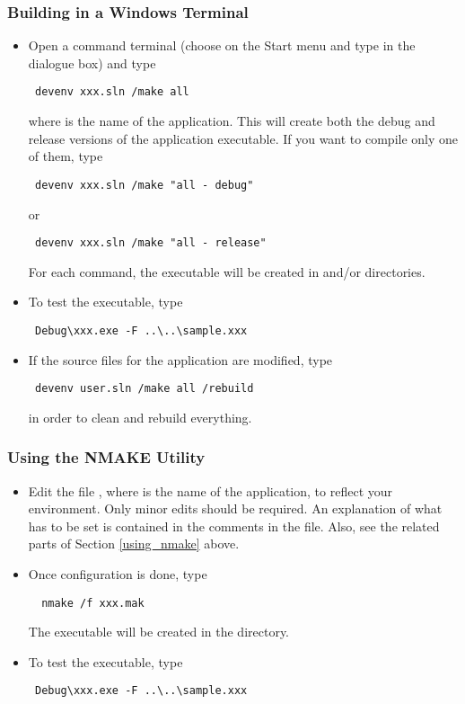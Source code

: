 \subsubsection{Building in a Windows Terminal}
\begin{itemize}
\item Open a command terminal (choose  on the Start menu and type
 in the dialogue box) and type
{\color{Brown}
\begin{verbatim}
 devenv xxx.sln /make all
\end{verbatim}
} where  is the name of the application. This will create both the
debug and release versions of the application executable. If you want to
compile only one of them, type 
{\color{Brown}
\begin{verbatim}
 devenv xxx.sln /make "all - debug"
\end{verbatim}
}
or 
{\color{Brown}
\begin{verbatim}
 devenv xxx.sln /make "all - release"
\end{verbatim}
}
For each command, the executable  will be created in 
 and/or 
directories. 

\item To test the executable, type 
{\color{Brown}
\begin{verbatim}
 Debug\xxx.exe -F ..\..\sample.xxx
\end{verbatim}
}
\item If the source files for the application are modified, type 
{\color{Brown}
\begin{verbatim}
 devenv user.sln /make all /rebuild
\end{verbatim}
}
in order to clean and rebuild everything.
\end{itemize} 

\subsubsection{Using the NMAKE Utility}

\begin{itemize}
\item 
Edit the file , where  is the name of the application,
to reflect your environment. Only minor edits should be required. An
explanation of what has to be set is contained in the comments in the
 file. Also, see the related parts of Section \ref{using_nmake}
above.

\item Once configuration is done, type 
{\color{Brown}
\begin{verbatim}
  nmake /f xxx.mak
\end{verbatim}
}
The executable  will be created in the  directory.
\item To test the executable, type 
{\color{Brown}
\begin{verbatim}
 Debug\xxx.exe -F ..\..\sample.xxx
\end{verbatim}
}
\end{itemize}

